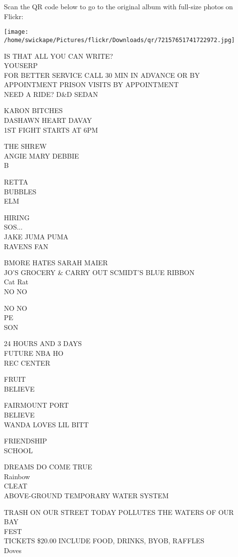 \documentclass[10pt,letterpaper]{article}
\begin{document}
Scan the QR code below to go to the original album with full-size photos on Flickr:

\texttt{[image: /home/swickape/Pictures/flickr/Downloads/qr/72157651741722972.jpg]}


IS THAT ALL YOU CAN WRITE?\\
YOUSERP\\
FOR BETTER SERVICE CALL 30 MIN IN ADVANCE OR BY APPOINTMENT PRISON VISITS BY APPOINTMENT\\
NEED A RIDE?  D\&D SEDAN

KARON BITCHES\\
DASHAWN HEART DAVAY\\
1ST FIGHT STARTS AT 6PM

THE SHREW\\
ANGIE MARY DEBBIE\\
B

RETTA\\
BUBBLES\\
ELM

HIRING\\
SOS...\\
JAKE JUMA PUMA\\
RAVENS FAN

BMORE HATES SARAH MAIER\\
JO'S GROCERY \& CARRY OUT SCMIDT'S BLUE RIBBON\\
Cat Rat\\
NO NO

NO NO\\
PE\\
SON

24 HOURS AND 3 DAYS\\
FUTURE NBA HO\\
REC CENTER

FRUIT\\
BELIEVE

FAIRMOUNT PORT\\
BELIEVE\\
WANDA LOVES LIL BITT

FRIENDSHIP\\
SCHOOL

DREAMS DO COME TRUE\\
Rainbow\\
CLEAT\\
ABOVE{-}GROUND TEMPORARY WATER SYSTEM

TRASH ON OUR STREET TODAY POLLUTES THE WATERS OF OUR BAY\\
FEST\\
TICKETS \$20.00 INCLUDE FOOD, DRINKS, BYOB, RAFFLES\\
Doves
\end{document}
